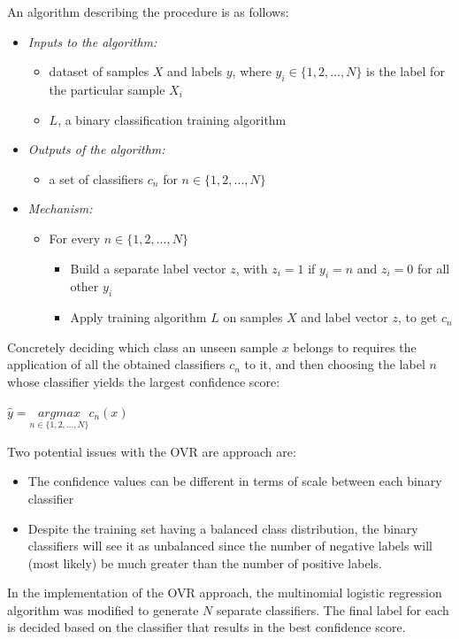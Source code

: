 \documentclass[journal]{IEEEtran}
\begin{document}
An algorithm describing the procedure is as follows:
\begin{itemize}
	\item\textit{Inputs to the algorithm:}
	\begin{itemize}
		\item dataset of samples $X$ and labels $y$, where $y_{i} \in \{1, 2, ..., N\}$ is the label for the particular sample $X_{i}$
		\item $L$, a binary classification training algorithm 
	\end{itemize}
	\item\textit{Outputs of the algorithm:}
	\begin{itemize}
		\item a set of classifiers $c_{n}$ for $n \in \{1, 2, ..., N\}$
	\end{itemize}
	\item\textit{Mechanism:}
	\begin{itemize}
		\item For every $n \in \{1, 2, ..., N\}$
		\begin{itemize}
			\item Build a separate label vector $z$, with $z_{i} = 1$ if $y_{i} = n$ and $z_{i} = 0$ for all other $y_{i}$
			\item Apply training algorithm $L$ on samples $X$ and label vector $z$, to get $c_{n}$ 
		\end{itemize}
	\end{itemize}
\end{itemize}\par
Concretely deciding which class an unseen sample $x$ belongs to requires the application of all the obtained classifiers $c_{n}$ to it, and then choosing the label $n$ whose classifier yields the largest confidence score:
\begin{center}
	${\hat{y}} =\underset{n\in\{1, 2, ..., N\}}{argmax} c_{n}(x)$
\end{center} \par
Two potential issues with the OVR are approach are:
\begin{itemize}
	\item The confidence values can be different in terms of scale between each binary classifier
	\item Despite the training set having a balanced class distribution, the binary classifiers will see it as unbalanced since the number of negative labels will (most likely) be much greater than the number of positive labels.
\end{itemize}
In the implementation of the OVR approach, the multinomial logistic regression algorithm was modified to generate $N$ separate classifiers. The final label for each is decided based on the classifier that results in the best confidence score.
\end{document}
